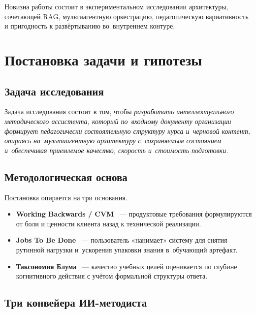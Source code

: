 Новизна работы состоит в экспериментальном исследовании архитектуры,
сочетающей RAG, мультиагентную оркестрацию, педагогическую
вариативность и пригодность к развёртыванию во~внутреннем контуре.

\section{Постановка задачи и гипотезы}

\subsection{Задача исследования}

Задача исследования состоит в том, чтобы \textit{разработать интеллектуального
методического ассистента, который по~входному документу организации
формирует педагогически состоятельную структуру курса и~черновой контент,
опираясь на~мультиагентную архитектуру с~сохраняемым состоянием
и~обеспечивая приемлемое качество, скорость и~стоимость подготовки.}

\subsection{Методологическая основа}

Постановка опирается на три основания.

\begin{itemize}
  \item \textbf{Working Backwards / CVM}~\cite{amazon_cvm_2014} —
    продуктовые требования формулируются от боли и ценности клиента
    назад к технической реализации.
  \item \textbf{Jobs To Be Done}~\cite{christensen_jtbd_2016} —
    пользователь «нанимает» систему для снятия рутинной нагрузки и~ускорения упаковки знания
    в~обучающий артефакт.
  \item \textbf{Таксономия Блума}~\cite{bloom_taxonomy_1956} —
    качество учебных целей оценивается по глубине когнитивного
    действия с учётом формальной структуры ответа.
\end{itemize}

\subsection{Три конвейера ИИ-методиста}

